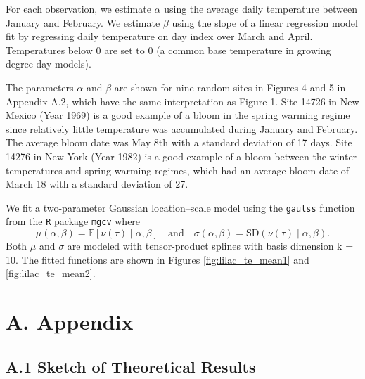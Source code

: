 \documentclass[
]{article}
\begin{document}
For each observation, we estimate \(\alpha\) using the average daily temperature between January and February. We estimate \(\beta\) using the slope of a linear regression model fit by regressing daily temperature on day index over March and April. Temperatures below \(0\) are set to \(0\) (a common base temperature in growing degree day models). 

The parameters \(\alpha\) and \(\beta\) are shown for nine random sites in Figures 4 and 5 in Appendix A.2, %
 which have the same interpretation as Figure 1. Site 14726 in New Mexico (Year 1969) is a good example of a bloom in the spring warming regime since relatively little temperature was accumulated during January and February. The average bloom date was May 8th with a standard deviation of 17 days. Site 14276 in New York (Year 1982) is a good example of a bloom between the winter temperatures and spring warming regimes, which had an average bloom date of March 18 with a standard deviation of 27. %

We fit a two-parameter Gaussian location--scale model using the \texttt{gaulss} function from the \texttt{R} package \texttt{mgcv} where \[ \mu(\alpha,\beta)=\mathbb{E}[\nu(\tau) \mid \alpha,\beta] \quad \text{and} \quad \sigma(\alpha,\beta)=\mathrm{SD}(\nu(\tau) \mid \alpha,\beta). \] Both \(\mu\) and \(\sigma\) are modeled with tensor-product splines with basis dimension k = 10. The fitted functions are shown in Figures \ref{fig:lilac_te_mean1} and \ref{fig:lilac_te_mean2}.


\newpage



\newpage
\section{A. Appendix}\label{a.-appendix}

\subsection{A.1 Sketch of Theoretical
Results}\label{a.1-sketch-of-theoretical-results}
\end{document}
